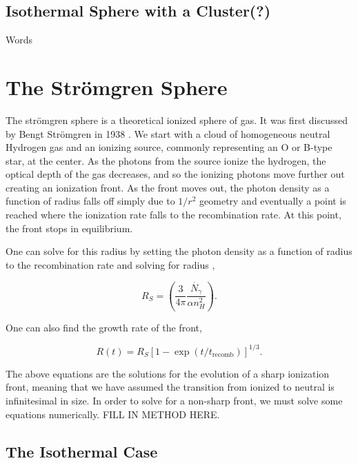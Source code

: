 \subsection{Isothermal Sphere with a Cluster(?)}
\label{sec:cluster}

Words

\section{The Str\"omgren Sphere}
\label{sec:stromgren}

The str\"omgren sphere is a theoretical ionized sphere of gas. It was first discussed by Bengt Str\"omgren in 1938 \citep{stromgren39}. We start with a cloud of homogeneous neutral Hydrogen gas and an ionizing source, commonly representing an O or B-type star, at the center. As the photons from the source ionize the hydrogen, the optical depth of the gas decreases, and so the ionizing photons move further out creating an ionization front. As the front moves out, the photon density as a function of radius falls off simply due to $1/r^2$ geometry and eventually a point is reached where the ionization rate falls to the recombination rate. At this point, the front stops in equilibrium.

One can solve for this radius by setting the photon density as a function of radius to the recombination rate and solving for radius \citep{stromgren39,spitzer78},

\begin{equation}
\label{eq:stromgrenradius}
R_S = \left( \frac{3}{4\pi} \frac{\dot{N_{\gamma}}}{\alpha n_H^2}\right).
\end{equation}

One can also find the growth rate of the front,

\begin{equation}
\label{eq:stromgrentime}
R(t) = R_S[1-\exp{(t/t_{\mbox{recomb}})}]^{1/3}.
\end{equation}

The above equations are the solutions for the evolution of a sharp ionization front, meaning that we have assumed the transition from ionized to neutral is infinitesimal in size. In order to solve for a non-sharp front, we must solve some equations numerically. FILL IN METHOD HERE.

\subsection{The Isothermal Case}
\label{sec:isostromgren}

